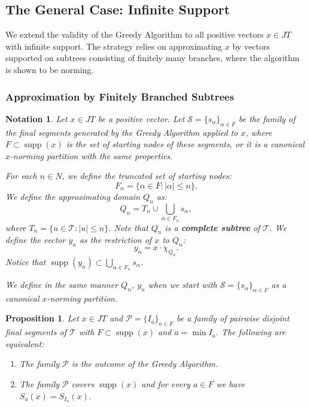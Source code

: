 \documentclass[11pt,a4paper]{amsart}
\newtheorem{proposition}[theorem]{Proposition}
\newtheorem{notation}[theorem]{Notation}
\newcommand{\JT}{JT}
\newcommand{\Tree}{\mathcal{T}}
\newcommand{\supp}{\operatorname{supp}}
\newcommand{\N}{N}
\begin{document}
\subsection{The General Case: Infinite Support}

We extend the validity of the Greedy Algorithm to all positive vectors $x \in \JT$ with infinite support. The strategy relies on approximating $x$ by vectors supported on subtrees consisting of finitely many branches, where the algorithm is shown to be norming.

\subsubsection{Approximation by Finitely Branched Subtrees}

\begin{notation}\label{n5}Let $x \in \JT$ be a positive vector. Let $\mathcal{S} = \{s_\alpha\}_{\alpha \in F}$ be the family of the final segments generated by the Greedy Algorithm applied to $x$, where $F \subset \supp(x)$ is the set of starting nodes of these segments, or it is a canonical $x$-norming partition with the same properties.

For each $n \in \N$, we define the truncated set of starting nodes:
\[ F_n = \{ \alpha \in F : |\alpha| \le n \}. \]
We define the approximating domain $Q_n$ as:
\[ Q_n = T_n \cup \bigcup_{\alpha \in F_n} s_\alpha, \]
where $T_n = \{ u \in \Tree : |u| \le n \}$. Note that $Q_n$ is a \textbf{complete subtree} of $\Tree$.
We define the vector $y_n$ as the restriction of $x$ to $Q_n$:
\[ y_n = x \cdot \chi_{Q_n}. \]
Notice that $\supp(y_n) \subset \bigcup_{\alpha \in F_n} s_{\alpha}$.

We define in the same manner  $Q_n$, $y_n$ when we start with $\mathcal{S} = \{s_\alpha\}_{\alpha \in F}$ as a canonical $x$-norming partition.
\end{notation}

\begin{proposition}\label{P5.9} Let $x\in \JT$ and $\mathcal{P} = \{ I_a\}_{a\in F}$ be a family of pairwise disjoint final segments of $\Tree$ with $F\subset \supp(x)$ and $a = \min I_a$. The following are equivalent:
\begin{enumerate}
\item The family $\mathcal{P}$ is the outcome of the Greedy Algorithm.
\item The family $\mathcal{P}$ covers $\supp(x)$ and for every $a \in F$ we have $S_a(x) = S_{I_a}(x).$
\end{enumerate}
\end{proposition}
\end{document}
